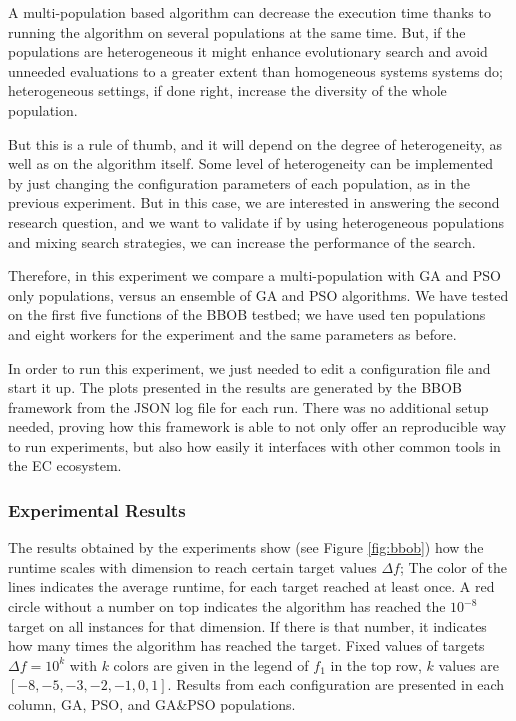 \documentclass[review]{elsarticle}
\begin{document}

A multi-population based algorithm can decrease the execution time
thanks to running the algorithm on several populations at the same
time. But, if the populations are heterogeneous 
it might enhance evolutionary search and avoid unneeded
evaluations to a greater extent than homogeneous systems systems do; heterogeneous settings, if
done right, increase the diversity of the whole population\cite{araujo2008multikulti}.

But this is a rule of thumb, and it will depend on the degree of heterogeneity,
as well as on the algorithm itself. Some level of heterogeneity can be
implemented by just changing the configuration parameters of each population,
as in the previous experiment. But in this case, we are interested in
answering the second research question, and we want to validate if by using
heterogeneous populations and mixing search strategies,  we can increase the performance of the
search.

Therefore, in this experiment we compare a multi-population with GA and PSO only populations,
versus an ensemble of GA and PSO algorithms. We have tested on the first five functions of the
BBOB testbed; we have used ten populations and eight workers for the experiment and the
same parameters as before.

In order to run this experiment, we just needed to edit a configuration file and
start it up. The plots presented in the results are generated by the BBOB
framework from the JSON log file for each run. There was no additional setup
needed, proving how this framework is able to not only offer an reproducible way
to run experiments, but also how easily it interfaces with other common tools in
the EC ecosystem.

\subsubsection{Experimental Results} 

The results obtained by the experiments show (see Figure \ref{fig:bbob}) how
the runtime scales with dimension to reach certain target values $\Delta f$;
The color of the lines indicates the average runtime, for each target reached
at least once. A red circle without a number on top indicates the algorithm
has reached the $10^{-8}$ target on all instances for that dimension. If there
is that number, it indicates how many times the algorithm has reached
the target. Fixed values of targets $\Delta f = 10^{k}$ with $k$ colors are
given in the legend of $f_1$ in the top row, $k$ values are $[-8,-5,-3,-2,-1,0,1]$. Results
from each configuration are presented in each column, GA, PSO, and GA\&PSO
populations. 
\end{document}
